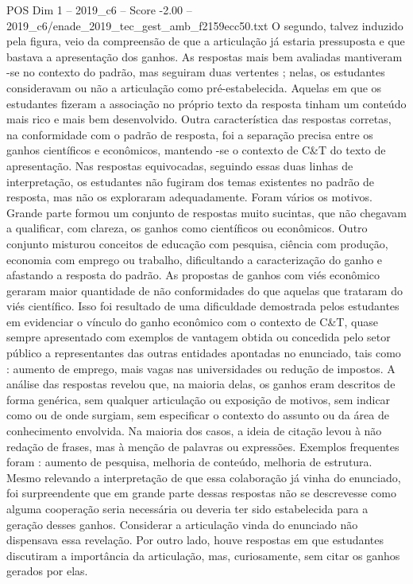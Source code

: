 \begin{textsample}{POS Dim 1 – 2019\_c6 – Score -2.00 – 2019\_c6/enade\_2019\_tec\_gest\_amb\_f2159ecc50.txt}
O segundo, talvez induzido pela figura, veio da compreensão de que a articulação já estaria pressuposta e que bastava a apresentação dos ganhos.
As respostas mais bem avaliadas mantiveram -se no contexto do padrão, mas seguiram duas vertentes ; nelas, os estudantes consideravam ou não a articulação como pré-estabelecida.
Aquelas em que os estudantes fizeram a associação no próprio texto da resposta tinham um conteúdo mais rico e mais bem desenvolvido.
Outra característica das respostas corretas, na conformidade com o padrão de resposta, foi a separação precisa entre os ganhos científicos e econômicos, mantendo -se o contexto de C\&T do texto de apresentação.
Nas respostas equivocadas, seguindo essas duas linhas de interpretação, os estudantes não fugiram dos temas existentes no padrão de resposta, mas não os exploraram adequadamente.
Foram vários os motivos.
Grande parte formou um conjunto de respostas muito sucintas, que não chegavam a qualificar, com clareza, os ganhos como científicos ou econômicos.
Outro conjunto misturou conceitos de educação com pesquisa, ciência com produção, economia com emprego ou trabalho, dificultando a caracterização do ganho e afastando a resposta do padrão.
As propostas de ganhos com viés econômico geraram maior quantidade de não conformidades do que aquelas que trataram do viés científico.
Isso foi resultado de uma dificuldade demostrada pelos estudantes em evidenciar o vínculo do ganho econômico com o contexto de C\&T, quase sempre apresentado com exemplos de vantagem obtida ou concedida pelo setor público a representantes das outras entidades apontadas no enunciado, tais como : aumento de emprego, mais vagas nas universidades ou redução de impostos.
A análise das respostas revelou que, na maioria delas, os ganhos eram descritos de forma genérica, sem qualquer articulação ou exposição de motivos, sem indicar como ou de onde surgiam, sem especificar o contexto do assunto ou da área de conhecimento envolvida.
Na maioria dos casos, a ideia de citação levou à não redação de frases, mas à menção de palavras ou expressões.
Exemplos frequentes foram : aumento de pesquisa, melhoria de conteúdo, melhoria de estrutura.
Mesmo relevando a interpretação de que essa colaboração já vinha do enunciado, foi surpreendente que em grande parte dessas respostas não se descrevesse como alguma cooperação seria necessária ou deveria ter sido estabelecida para a geração desses ganhos.
Considerar a articulação vinda do enunciado não dispensava essa revelação.
Por outro lado, houve respostas em que estudantes discutiram a importância da articulação, mas, curiosamente, sem citar os ganhos gerados por elas.

\end{textsample}
